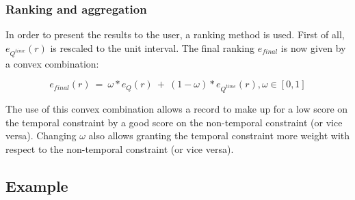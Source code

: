 \vspace{-5pt}

\subsubsection{Ranking and aggregation}
In order to present the results to the user, a ranking method is used. First of all, $e_{Q^{time}}(r)$ is rescaled to the unit interval. The final ranking $e_{final}$ is now given by a convex combination:


\begin{equation}
\label{eq:convex-comb}
e_{final}(r)\ =\ \omega*e_{Q}(r)\ +\ (1-\omega)*e_{Q^{time}}(r), \omega \in \left[0, 1 \right]
\end{equation}

The use of this convex combination allows a record to make up for a low score on the temporal constraint by a good score on the non-temporal constraint (or vice versa). Changing $\omega$ also allows granting the temporal constraint more weight with respect to the non-temporal constraint (or vice versa).


\subsection{Example}

